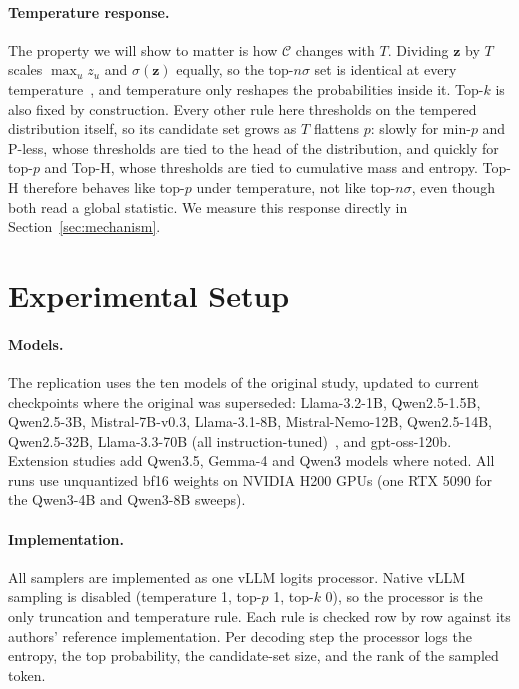 \documentclass{article}
\begin{document}
\paragraph{Temperature response.}
The property we will show to matter is how $\mathcal{C}$ changes with $T$. Dividing $\mathbf{z}$ by $T$ scales $\max_u z_u$ and $\sigma(\mathbf{z})$ equally, so the top-$n\sigma$ set is identical at every temperature~\citep{tang2024topnsigma}, and temperature only reshapes the probabilities inside it. Top-$k$ is also fixed by construction. Every other rule here thresholds on the tempered distribution itself, so its candidate set grows as $T$ flattens $p$: slowly for min-$p$ and P-less, whose thresholds are tied to the head of the distribution, and quickly for top-$p$ and Top-H, whose thresholds are tied to cumulative mass and entropy. Top-H therefore behaves like top-$p$ under temperature, not like top-$n\sigma$, even though both read a global statistic. We measure this response directly in Section~\ref{sec:mechanism}.

\section{Experimental Setup}
\label{sec:setup}

\paragraph{Models.}
The replication uses the ten models of the original study, updated to current checkpoints where the original was superseded: Llama-3.2-1B, Qwen2.5-1.5B, Qwen2.5-3B, Mistral-7B-v0.3, Llama-3.1-8B, Mistral-Nemo-12B, Qwen2.5-14B, Qwen2.5-32B, Llama-3.3-70B (all instruction-tuned)~\citep{dubey2024llama3,yang2024qwen2,jiang2023mistral}, and gpt-oss-120b. Extension studies add Qwen3.5, Gemma-4 and Qwen3 models where noted. All runs use unquantized bf16 weights on NVIDIA H200 GPUs (one RTX 5090 for the Qwen3-4B and Qwen3-8B sweeps).

\paragraph{Implementation.}
All samplers are implemented as one vLLM logits processor. Native vLLM sampling is disabled (temperature 1, top-$p$ 1, top-$k$ 0), so the processor is the only truncation and temperature rule. Each rule is checked row by row against its authors' reference implementation. Per decoding step the processor logs the entropy, the top probability, the candidate-set size, and the rank of the sampled token.
\end{document}
